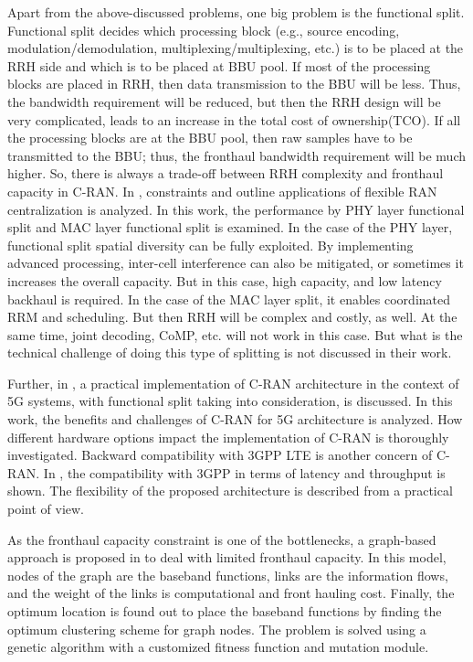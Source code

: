 \begin{multicols}{2}
Apart from the above-discussed problems, one big problem is the functional split. Functional split decides which processing block (e.g., source encoding, modulation/demodulation, multiplexing/multiplexing, etc.) is to be placed at the RRH side and which is to be placed at BBU pool. If most of the processing blocks are placed in RRH, then data transmission to the BBU will be less. Thus, the bandwidth requirement will be reduced, but then the RRH design will be very complicated, leads to an increase in the total cost of ownership(TCO). If all the processing blocks are at the BBU pool, then raw samples have to be transmitted to the BBU; thus, the fronthaul bandwidth requirement will be much higher. So, there is always a trade-off between RRH complexity and fronthaul capacity in C-RAN. In \cite{art3-key18}, constraints and outline applications of flexible RAN centralization is analyzed. In this work, the performance by PHY layer functional split and MAC layer functional split is examined. In the case of the PHY layer, functional split spatial diversity can be fully exploited. By implementing advanced processing, inter-cell interference can also be mitigated, or sometimes it increases the overall capacity. But in this case, high capacity, and low latency backhaul is required. In the case of the MAC layer split, it enables coordinated RRM and scheduling. But then RRH will be complex and costly, as well. At the same time, joint decoding, CoMP, etc. will not work in this case. But what is the technical challenge of doing this type of splitting is not discussed in their work.

Further, in \cite{art3-key19}, a practical implementation of C-RAN architecture in the context of 5G systems, with functional split taking into consideration, is discussed. In this work, the benefits and challenges of C-RAN for 5G architecture is analyzed. How different hardware options impact the implementation of C-RAN is thoroughly investigated. Backward compatibility with 3GPP LTE is another concern of C-RAN. In \cite{art3-key19}, the compatibility with 3GPP in terms of latency and throughput is shown. The flexibility of the proposed architecture is described from a practical point of view.

As the fronthaul capacity constraint is one of the bottlenecks, a graph-based approach is proposed in \cite{art3-key20} to deal with limited fronthaul capacity. In this model, nodes of the graph are the baseband functions, links are the information flows, and the weight of the links is computational and front hauling cost. Finally, the optimum location is found out to place the baseband functions by finding the optimum clustering scheme for graph nodes. The problem is solved using a genetic algorithm with a customized fitness function and mutation module.


\end{multicols}
